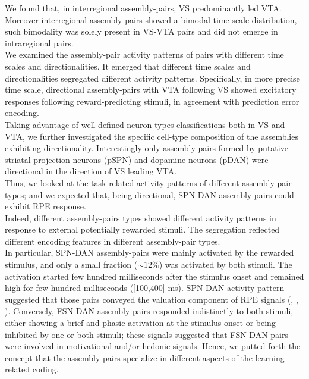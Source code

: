 We found that, in interregional assembly-pairs, VS predominantly led VTA. Moreover interregional assembly-pairs showed a bimodal time scale distribution, such bimodality was solely present in VS-VTA pairs and did not emerge in intraregional pairs.\\We examined the assembly-pair activity patterns of pairs with different time scales and directionalities. It emerged that different time scales and directionalities segregated different activity patterns. Specifically, in more precise time scale, directional assembly-pairs with VTA following VS showed excitatory responses following reward-predicting stimuli, in agreement with prediction error encoding.\\Taking advantage of well defined neuron types classifications both in VS and VTA, we further investigated the specific cell-type composition of the assemblies exhibiting directionality. Interestingly only assembly-pairs formed by putative striatal projection neurons (pSPN) and dopamine neurons (pDAN) were directional in the direction of VS leading VTA.\\Thus, we looked at the task related activity patterns of different assembly-pair types; and we expected that, being directional, SPN-DAN assembly-pairs could exhibit RPE response.\\Indeed, different assembly-pairs types showed different activity patterns in response to external potentially rewarded stimuli. The segregation reflected different encoding features in different assembly-pair types.\\In particular, SPN-DAN assembly-pairs were mainly activated by the rewarded stimulus, and only a small fraction ($\sim12\%$) was activated by both stimuli. The activation started few hundred milliseconds after the stimulus onset and remained high for few hundred milliseconds ([100,400] ms). SPN-DAN activity pattern suggested that those pairs conveyed the valuation component of RPE signals (\cite{Tobler2003}, \cite{Nomoto2010}, \cite{Schultz2016}). Conversely, FSN-DAN assembly-pairs responded indistinctly to both stimuli, either showing a brief and phasic activation at the stimulus onset or being inhibited by one or both stimuli; these signals suggested that FSN-DAN pairs were involved in motivational and/or hedonic signals. Hence, we putted forth the concept that the assembly-pairs specialize in different aspects of the learning-related coding.\\%
